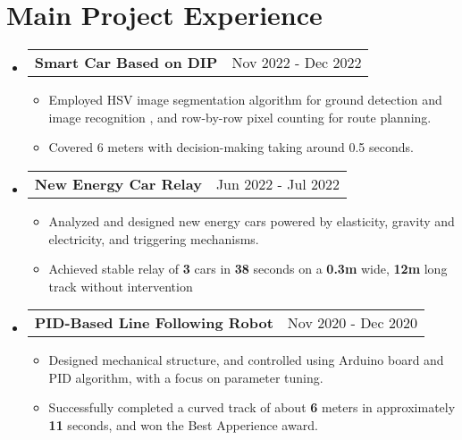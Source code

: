 \documentclass[letterpaper,11pt]{article}
\makeatletter
\newcommand{\resumeItem}[1]{
  \item\small{
    {#1 \vspace{-2pt}}
  }
}
\newcommand{\resumeProjectHeading}[2]{
    \item
    \begin{tabular*}{0.97\textwidth}{l@{\extracolsep{\fill}}r}
      \small#1 & #2 \\
    \end{tabular*}\vspace{-7pt}
}
\newcommand{\resumeSubHeadingListStart}{\begin{itemize}[leftmargin=0.15in, label={}]}
\newcommand{\resumeSubHeadingListEnd}{\end{itemize}}
\newcommand{\resumeItemListStart}{\begin{itemize}}
\newcommand{\resumeItemListEnd}{\end{itemize}\vspace{-5pt}}
\makeatother
\begin{document}
\section{Main Project Experience}
  \resumeSubHeadingListStart
    \resumeProjectHeading
      {\textbf{Smart Car Based on DIP}}{Nov 2022 - Dec 2022}
      \resumeItemListStart
        \resumeItem{Employed HSV image segmentation algorithm for ground detection and image recognition , and row-by-row pixel counting for route planning.}
        \resumeItem{Covered 6 meters with decision-making taking around 0.5 seconds.}
      \resumeItemListEnd
    \resumeProjectHeading
      {\textbf{New Energy Car Relay}}{Jun 2022 - Jul 2022}
      \resumeItemListStart
        \resumeItem{Analyzed and designed new energy cars powered by elasticity, gravity and electricity, and triggering mechanisms.}
        \resumeItem{Achieved stable relay of \textbf{3} cars in \textbf{38} seconds on a \textbf{0.3m} wide, \textbf{12m} long track without intervention}
      \resumeItemListEnd
    \resumeProjectHeading
      {\textbf{PID-Based Line Following Robot}}{Nov 2020 - Dec 2020}
      \resumeItemListStart
        \resumeItem{Designed mechanical structure, and controlled using Arduino board and PID algorithm, with a focus on parameter tuning. }
        \resumeItem{Successfully completed a curved track of about \textbf{6} meters in approximately \textbf{11} seconds, and won the Best Apperience award.}
      \resumeItemListEnd
  \resumeSubHeadingListEnd

\end{document}
